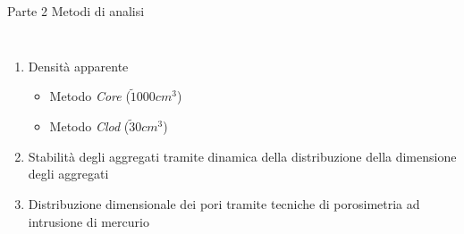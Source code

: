 \documentclass[10pt]{beamer}
\begin{document}
\begin{frame}{Parte 2 \small{Metodi di analisi}}
  \begin{columns}[c]
    \begin{enumerate}[<+->]
    \item Densit\`a apparente
      \begin{itemize}
      \item Metodo \emph{Core} ($\tilde 1000 cm^3$)
      \pause
      \item Metodo \emph{Clod} ($\tilde 30 cm^3$)
      \pause
      \end{itemize}
    \item Stabilit\`a degli aggregati tramite dinamica della
      distribuzione della dimensione degli aggregati
    \item Distribuzione dimensionale dei pori tramite tecniche di
      porosimetria ad intrusione di mercurio      
    \end{enumerate}

\end{columns}
\end{frame}
\end{document}
